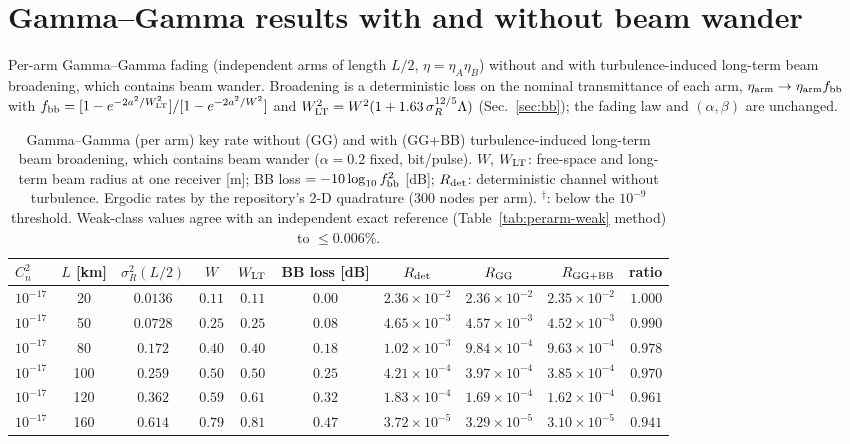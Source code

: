 \documentclass[11pt,a4paper]{article}
\theoremstyle{plain}
\theoremstyle{remark}
\begin{document}
\section{Gamma--Gamma results with and without beam wander}
\label{sec:bw}
Per-arm Gamma--Gamma fading (independent arms of length $L/2$, $\eta=\eta_A\eta_B$) without and with turbulence-induced long-term beam broadening, which contains beam wander. Broadening is a deterministic loss on the nominal transmittance of each arm, $\eta_{\rm arm}\to\eta_{\rm arm}f_{\rm bb}$ with $f_{\rm bb}=[1-e^{-2a^2/W_{\rm LT}^2}]/[1-e^{-2a^2/W^2}]$ and $W_{\rm LT}^2=W^2(1+1.63\,\sigma_R^{12/5}\Lambda)$ (Sec.~\ref{sec:bb}); the fading law and $(\alpha,\beta)$ are unchanged.
\begin{table}[htbp]
\centering\scriptsize
\caption{Gamma--Gamma (per arm) key rate without (GG) and with (GG+BB) turbulence-induced long-term beam broadening, which contains beam wander ($\alpha=0.2$ fixed, bit/pulse). $W$, $W_{\rm LT}$: free-space and long-term beam radius at one receiver [m]; BB loss $=-10\log_{10}f_{\rm bb}^2$ [dB]; $R_{\rm det}$: deterministic channel without turbulence. Ergodic rates by the repository's 2-D quadrature (300 nodes per arm). $^{\dagger}$: below the $10^{-9}$ threshold. Weak-class values agree with an independent exact reference (Table~\ref{tab:perarm-weak} method) to $\le0.006\%$.}
\label{tab:bw-skr}
\begin{tabular}{lcccccccrr}
\toprule
$C_n^2$ & $L$ [km] & $\sigma_R^2(L/2)$ & $W$ & $W_{\rm LT}$ & BB loss [dB] & $R_{\rm det}$ & $R_{\rm GG}$ & $R_{\rm GG+BB}$ & ratio\\
\midrule
$10^{-17}$ & 20 & $0.0136$ & $0.11$ & $0.11$ & $0.00$ & $2.36\times10^{-2}$ & $2.36\times10^{-2}$ & $2.35\times10^{-2}$ & $1.000$ \\
$10^{-17}$ & 50 & $0.0728$ & $0.25$ & $0.25$ & $0.08$ & $4.65\times10^{-3}$ & $4.57\times10^{-3}$ & $4.52\times10^{-3}$ & $0.990$ \\
$10^{-17}$ & 80 & $0.172$ & $0.40$ & $0.40$ & $0.18$ & $1.02\times10^{-3}$ & $9.84\times10^{-4}$ & $9.63\times10^{-4}$ & $0.978$ \\
$10^{-17}$ & 100 & $0.259$ & $0.50$ & $0.50$ & $0.25$ & $4.21\times10^{-4}$ & $3.97\times10^{-4}$ & $3.85\times10^{-4}$ & $0.970$ \\
$10^{-17}$ & 120 & $0.362$ & $0.59$ & $0.61$ & $0.32$ & $1.83\times10^{-4}$ & $1.69\times10^{-4}$ & $1.62\times10^{-4}$ & $0.961$ \\
$10^{-17}$ & 160 & $0.614$ & $0.79$ & $0.81$ & $0.47$ & $3.72\times10^{-5}$ & $3.29\times10^{-5}$ & $3.10\times10^{-5}$ & $0.941$ \\

\end{tabular}
\end{table}
\end{document}
